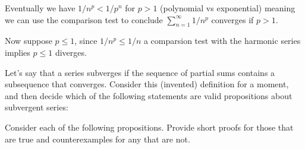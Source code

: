\begin{solution}
  Eventually we have $1/n^p < 1/p^n$ for $p > 1$ (polynomial vs exponential) meaning we can use the comparison test to conclude $\sum_{n=1}^\infty 1/n^p$ converges if $p > 1$.

  Now suppose $p \le 1$, since $1/n^p \le 1/n$ a comparsion test with the harmonic series implies $p \le 1$ diverges.
\end{solution}

\begin{exercise}
  Let's say that a series subverges if the sequence of partial sums contains a subsequence that converges. Consider this (invented) definition for a moment, and then decide which of the following statements are valid propositions about subvergent series:
\end{exercise}

\begin{solution}
  \enum{
    \item \TODO
    \item \TODO
    \item \TODO
    \item \TODO
  }
\end{solution}

\begin{exercise}
\end{exercise}

\begin{solution}
  \enum{
    \item \TODO
    \item \TODO
  }
\end{solution}

\begin{exercise}
  Consider each of the following propositions. Provide short proofs for those that are true and counterexamples for any that are not.
\end{exercise}

